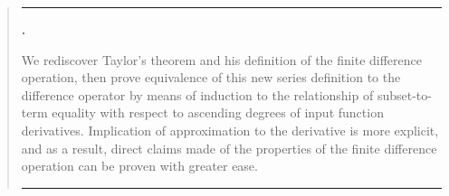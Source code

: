 
\renewenvironment*{abstract}{
  \begin{quote}
    \noindent \rule{\linewidth}{.5pt}
    \par{\bfseries \abstractname.}
    }{\\
    \medskip \noindent \rule{\linewidth}{.5pt}
  \end{quote}
}

\begin{abstract}
  \label{abstract}
  We rediscover Taylor's theorem and his definition of the finite difference operation, then prove equivalence of this new series definition to the difference operator by means of induction to the relationship of subset-to-term equality with respect to ascending degrees of input function derivatives. Implication of approximation to the derivative is more explicit, and as a result, direct claims made of the properties of the finite difference operation can be proven with greater ease.
\end{abstract}